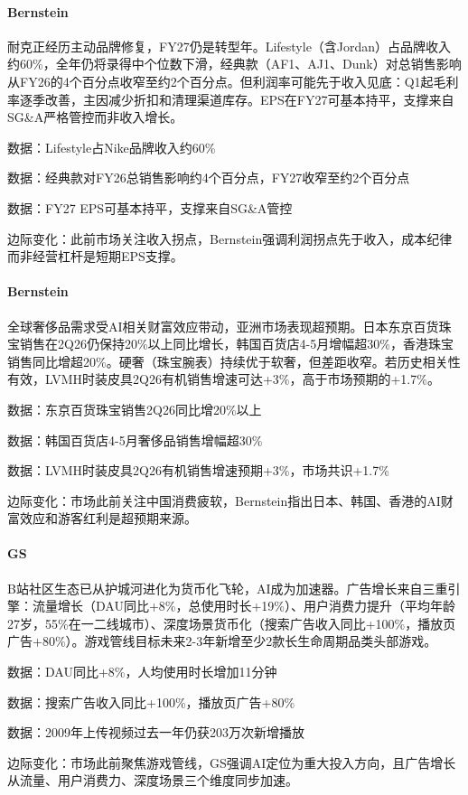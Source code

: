 \documentclass[11pt]{ctexart}
\begin{document}
\paragraph{Bernstein} 耐克正经历主动品牌修复，FY27仍是转型年。Lifestyle（含Jordan）占品牌收入约60\%，全年仍将录得中个位数下滑，经典款（AF1、AJ1、Dunk）对总销售影响从FY26的4个百分点收窄至约2个百分点。但利润率可能先于收入见底：Q1起毛利率逐季改善，主因减少折扣和清理渠道库存。EPS在FY27可基本持平，支撑来自SG\&A严格管控而非收入增长。
{\small\color{refgray}数据：Lifestyle占Nike品牌收入约60\%\par}
{\small\color{refgray}数据：经典款对FY26总销售影响约4个百分点，FY27收窄至约2个百分点\par}
{\small\color{refgray}数据：FY27 EPS可基本持平，支撑来自SG\&A管控\par}
{\small\color{refgray}边际变化：此前市场关注收入拐点，Bernstein强调利润拐点先于收入，成本纪律而非经营杠杆是短期EPS支撑。\par}
\paragraph{Bernstein} 全球奢侈品需求受AI相关财富效应带动，亚洲市场表现超预期。日本东京百货珠宝销售在2Q26仍保持20\%以上同比增长，韩国百货店4-5月增幅超30\%，香港珠宝销售同比增超20\%。硬奢（珠宝腕表）持续优于软奢，但差距收窄。若历史相关性有效，LVMH时装皮具2Q26有机销售增速可达+3\%，高于市场预期的+1.7\%。
{\small\color{refgray}数据：东京百货珠宝销售2Q26同比增20\%以上\par}
{\small\color{refgray}数据：韩国百货店4-5月奢侈品销售增幅超30\%\par}
{\small\color{refgray}数据：LVMH时装皮具2Q26有机销售增速预期+3\%，市场共识+1.7\%\par}
{\small\color{refgray}边际变化：市场此前关注中国消费疲软，Bernstein指出日本、韩国、香港的AI财富效应和游客红利是超预期来源。\par}
\paragraph{GS} B站社区生态已从护城河进化为货币化飞轮，AI成为加速器。广告增长来自三重引擎：流量增长（DAU同比+8\%，总使用时长+19\%）、用户消费力提升（平均年龄27岁，55\%在一二线城市）、深度场景货币化（搜索广告收入同比+100\%，播放页广告+80\%）。游戏管线目标未来2-3年新增至少2款长生命周期品类头部游戏。
{\small\color{refgray}数据：DAU同比+8\%，人均使用时长增加11分钟\par}
{\small\color{refgray}数据：搜索广告收入同比+100\%，播放页广告+80\%\par}
{\small\color{refgray}数据：2009年上传视频过去一年仍获203万次新增播放\par}
{\small\color{refgray}边际变化：市场此前聚焦游戏管线，GS强调AI定位为重大投入方向，且广告增长从流量、用户消费力、深度场景三个维度同步加速。\par}
\end{document}
